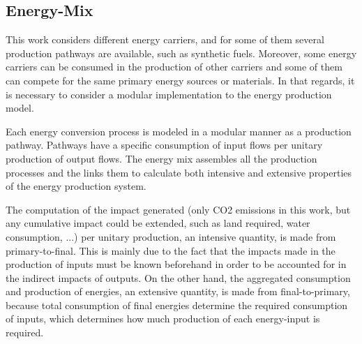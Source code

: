 \documentclass[
]{kaohandt}
\begin{document}

\subsection{Energy-Mix}

This work considers different energy carriers, and for some of them several production pathways are available, such as synthetic fuels. Moreover, some energy carriers can be consumed in the production of other carriers and some of them can compete for the same primary energy sources or materials. In that regards, it is necessary to consider a modular implementation to the energy production model.

Each energy conversion process is modeled in a modular manner as a production pathway. Pathways have a specific consumption of input flows per unitary production of output flows. The energy mix assembles all the production processes and the links them to calculate both intensive and extensive properties of the energy production system.

The computation of the impact generated (only CO2 emissions in this work, but any cumulative impact could be extended, such as land required, water consumption, ...) per unitary production, an intensive quantity, is made from primary-to-final. This is mainly due to the fact that the impacts made in the production of inputs must be known beforehand in order to be accounted for in the indirect impacts of outputs. On the other hand, the aggregated consumption and production of energies, an extensive quantity, is made from final-to-primary, because total consumption of final energies determine the required consumption of inputs, which determines how much production of each energy-input is required.
\end{document}
